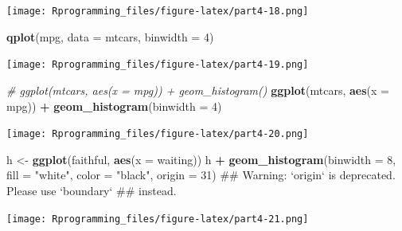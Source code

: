 \documentclass[10pt,]{krantz}
\makeatletter
\newenvironment{Shaded}{\begin{snugshade}}{\end{snugshade}}
\newcommand{\KeywordTok}[1]{\textcolor[rgb]{0.13,0.29,0.53}{\textbf{#1}}}
\newcommand{\DataTypeTok}[1]{\textcolor[rgb]{0.13,0.29,0.53}{#1}}
\newcommand{\DecValTok}[1]{\textcolor[rgb]{0.00,0.00,0.81}{#1}}
\newcommand{\StringTok}[1]{\textcolor[rgb]{0.31,0.60,0.02}{#1}}
\newcommand{\CommentTok}[1]{\textcolor[rgb]{0.56,0.35,0.01}{\textit{#1}}}
\newcommand{\OperatorTok}[1]{\textcolor[rgb]{0.81,0.36,0.00}{\textbf{#1}}}
\newcommand{\NormalTok}[1]{#1}
\newenvironment{kframe}{%
\medskip{}
\setlength{\fboxsep}{.8em}
 \def\at@end@of@kframe{}%
 \ifinner\ifhmode%
  \def\at@end@of@kframe{\end{minipage}}%
  \begin{minipage}{\columnwidth}%
 \fi\fi%
 \def\FrameCommand##1{\hskip\@totalleftmargin \hskip-\fboxsep
 \colorbox{shadecolor}{##1}\hskip-\fboxsep
     \hskip-\linewidth \hskip-\@totalleftmargin \hskip\columnwidth}%
 \MakeFramed {\advance\hsize-\width
   \@totalleftmargin\z@ \linewidth\hsize
   \@setminipage}}%
 {\par\unskip\endMakeFramed%
 \at@end@of@kframe}
\renewenvironment{Shaded}{\begin{kframe}}{\end{kframe}}
\theoremstyle{definition}
\theoremstyle{definition}
\theoremstyle{remark}
\makeatother
\begin{document}
\texttt{[image: Rprogramming\_files/figure-latex/part4-18.png]}

\begin{Shaded}
\begin{Highlighting}[]


\KeywordTok{qplot}\NormalTok{(mpg, }\DataTypeTok{data =}\NormalTok{ mtcars, }\DataTypeTok{binwidth =} \DecValTok{4}\NormalTok{)}
\end{Highlighting}
\end{Shaded}

\texttt{[image: Rprogramming\_files/figure-latex/part4-19.png]}

\begin{Shaded}
\begin{Highlighting}[]


\CommentTok{# ggplot(mtcars, aes(x = mpg)) + geom_histogram() }
\KeywordTok{ggplot}\NormalTok{(mtcars, }\KeywordTok{aes}\NormalTok{(}\DataTypeTok{x =}\NormalTok{ mpg)) }\OperatorTok{+}\StringTok{ }\KeywordTok{geom_histogram}\NormalTok{(}\DataTypeTok{binwidth =} \DecValTok{4}\NormalTok{)}
\end{Highlighting}
\end{Shaded}

\texttt{[image: Rprogramming\_files/figure-latex/part4-20.png]}

\begin{Shaded}
\begin{Highlighting}[]


\NormalTok{h <-}\StringTok{ }\KeywordTok{ggplot}\NormalTok{(faithful, }\KeywordTok{aes}\NormalTok{(}\DataTypeTok{x =}\NormalTok{ waiting))}
\NormalTok{h }\OperatorTok{+}\StringTok{ }\KeywordTok{geom_histogram}\NormalTok{(}\DataTypeTok{binwidth =} \DecValTok{8}\NormalTok{, }\DataTypeTok{fill =} \StringTok{"white"}\NormalTok{, }\DataTypeTok{color =} \StringTok{"black"}\NormalTok{, }\DataTypeTok{origin =} \DecValTok{31}\NormalTok{)}
\NormalTok{## Warning: `origin` is deprecated. Please use `boundary`}
\NormalTok{## instead.}
\end{Highlighting}
\end{Shaded}

\texttt{[image: Rprogramming\_files/figure-latex/part4-21.png]}
\end{document}
